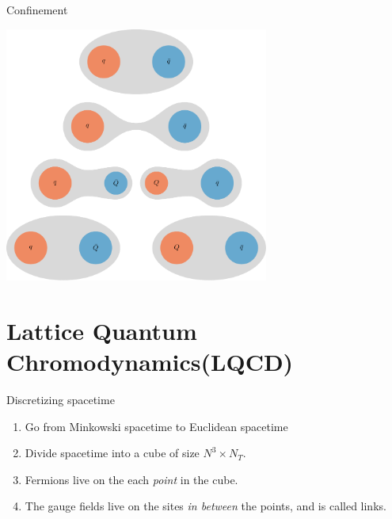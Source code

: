 \documentclass[10pt,show notes on second screen]{beamer}
\begin{document}
\begin{frame}{Confinement}
    \begin{center}
        \includegraphics[width=0.65\textwidth]{../figures/illustrations/qcd/confinement/string-breaking.pdf}
    \end{center}
\end{frame}

\section{Lattice Quantum Chromodynamics(LQCD)}

\begin{frame}{Discretizing spacetime}
\begin{enumerate}[<+->]
    \item Go from Minkowski spacetime to Euclidean spacetime
    \item Divide spacetime into a cube of size $N^3\times N_T$.
    \item Fermions live on the each \textit{point} in the cube.
    \item The gauge fields live on the sites \textit{in between} the points, and is called links.
\end{enumerate}
\end{frame}
\end{document}
